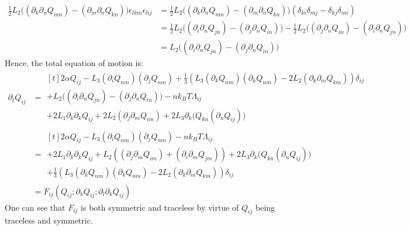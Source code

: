 \documentclass[reqno]{article}
\begin{document}
	\begin{equation}
	\begin{split}
		\tfrac12 L_2 \bigl( (\partial_k \partial_n Q_{mn}) - (\partial_m \partial_n Q_{kn} ) \bigr) \epsilon_{lkm} \epsilon_{lij}
		&= \tfrac12 L_2 \bigl( (\partial_k \partial_n Q_{mn}) - (\partial_m \partial_n Q_{kn} ) \bigr)
		\left( \delta_{ki} \delta_{mj} - \delta_{kj} \delta_{mi} \right) \\
		&= \tfrac12 L_2 \bigl( (\partial_i \partial_n Q_{jn}) - (\partial_j \partial_n Q_{in} ) \bigr)
		- \tfrac12 L_2 \bigl( (\partial_j \partial_n Q_{in}) - (\partial_i \partial_n Q_{jn} ) \bigr) \\
		&= L_2 \bigl( (\partial_i \partial_n Q_{jn}) - (\partial_j \partial_n Q_{in} ) \bigr)
	\end{split}
	\end{equation}
	Hence, the total equation of motion is:
	\begin{equation}
	\begin{split}
		\partial_t Q_{ij}
		&=
		\begin{multlined}[t]
		2 \alpha Q_{ij}
		- L_3 (\partial_i Q_{nm}) (\partial_j Q_{nm}) 
		+ \tfrac13 \left( L_3 (\partial_k Q_{nm})(\partial_k Q_{nm}) 
		- 2 L_2 (\partial_k \partial_m Q_{km}) \right) \delta_{ij} \\
		+ L_2 \bigl( (\partial_i \partial_n Q_{jn}) - (\partial_j \partial_n Q_{in} ) \bigr)
		- n k_B T \Lambda_{ij} \\
		+ 2 L_1 \partial_k \partial_k Q_{ij} 
		+ 2 L_2 (\partial_j \partial_m Q_{im})
		+ 2 L_3 \partial_k \bigl( Q_{kn} (\partial_n Q_{ij}) \bigr)
		\end{multlined} \\
		&=
		\begin{multlined}[t]
		2 \alpha Q_{ij}
		- L_3 (\partial_i Q_{nm}) (\partial_j Q_{nm})
		- n k_B T \Lambda_{ij} \\
		+ 2 L_1 \partial_k \partial_k Q_{ij} 
		+ L_2 \left( (\partial_j \partial_m Q_{im}) + (\partial_i \partial_m Q_{jm}) \right)
		+ 2 L_3 \partial_k \bigl( Q_{kn} (\partial_n Q_{ij}) \bigr) \\
		+ \tfrac13 \left( L_3 (\partial_k Q_{nm})(\partial_k Q_{nm}) 
		- 2 L_2 (\partial_k \partial_m Q_{km}) \right) \delta_{ij}
		\end{multlined} \\
		&= F_{ij} \left(Q_{ij} ; \partial_k Q_{ij} ; \partial_l \partial_k Q_{ij}\right)
	\end{split}
	\end{equation}
	One can see that $F_{ij}$ is both symmetric and traceless by virtue of $Q_{ij}$ being traceless and symmetric.
	
\end{document}
